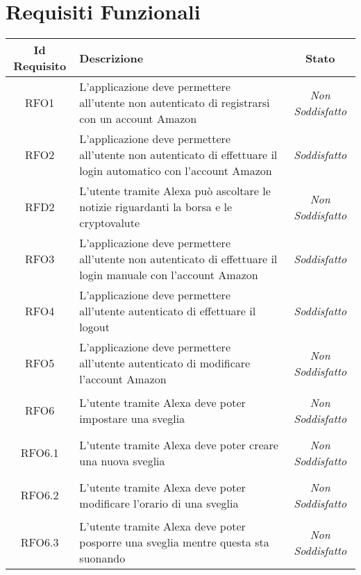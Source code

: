 \section{Requisiti Funzionali}
\normalsize
\begin{longtable}{|c|>{\centering}m{7cm}|c|}
	\hline
	\textbf{Id Requisito} & \textbf{Descrizione} & \textbf{Stato}\\
	\hline
	\endhead
	\hypertarget{RFO1}{RFO1} & L'applicazione deve permettere all'utente non autenticato di registrarsi con un account Amazon & {\textit{Non Soddisfatto}}\\ \hline
	
	\hypertarget{RFO2}{RFO2} & L'applicazione deve permettere all'utente non autenticato di effettuare il login automatico con l'account Amazon & {\textit{Soddisfatto}}\\ \hline
	
	\hypertarget{RFD2}{RFD2} & L'utente tramite Alexa può ascoltare le notizie riguardanti la borsa e le cryptovalute & {\textit{Non Soddisfatto}}\\ \hline
	
	\hypertarget{RFO3}{RFO3} & L'applicazione deve permettere all'utente non autenticato di effettuare il login manuale con l'account Amazon & {\textit{ Soddisfatto}}\\ \hline
	
	\hypertarget{RFO4}{RFO4} & L'applicazione deve permettere all'utente autenticato di effettuare il logout & {\textit{Soddisfatto}}\\ \hline
	
	\hypertarget{RFO5}{RFO5} & L'applicazione deve permettere all'utente autenticato di modificare l'account Amazon & {\textit{Non Soddisfatto}}\\ \hline
	
	\hypertarget{RFO6}{RFO6} & L'utente tramite Alexa deve poter impostare una sveglia & {\textit{Non Soddisfatto}}\\ \hline
	
	\hypertarget{RFO6.1}{RFO6.1} & L'utente tramite Alexa deve poter creare una nuova sveglia & {\textit{Non Soddisfatto}}\\ \hline
	
	\hypertarget{RFO6.2}{RFO6.2} & L'utente tramite Alexa deve poter modificare l'orario di una sveglia & {\textit{Non Soddisfatto}}\\ \hline
	
	\hypertarget{RFO6.3}{RFO6.3} & L'utente tramite Alexa deve poter posporre una sveglia mentre questa sta suonando & {\textit{Non Soddisfatto}}\\ \hline
	

\end{longtable}
